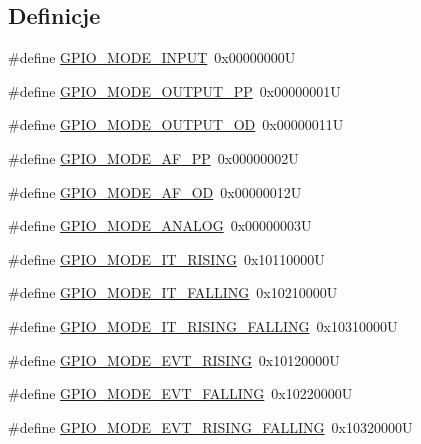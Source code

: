 \subsection*{Definicje}
\begin{DoxyCompactItemize}
\item 
\#define \hyperlink{group___g_p_i_o__mode__define_gaf40bec3146810028a84b628d37d3b391}{G\+P\+I\+O\+\_\+\+M\+O\+D\+E\+\_\+\+I\+N\+P\+UT}~0x00000000U
\item 
\#define \hyperlink{group___g_p_i_o__mode__define_ga1013838a64cec2f8c88f079c449d1982}{G\+P\+I\+O\+\_\+\+M\+O\+D\+E\+\_\+\+O\+U\+T\+P\+U\+T\+\_\+\+PP}~0x00000001U
\item 
\#define \hyperlink{group___g_p_i_o__mode__define_ga2f91757829f6e9505ec386b840941929}{G\+P\+I\+O\+\_\+\+M\+O\+D\+E\+\_\+\+O\+U\+T\+P\+U\+T\+\_\+\+OD}~0x00000011U
\item 
\#define \hyperlink{group___g_p_i_o__mode__define_ga526c72c5264316fc05c775b6cad4aa6a}{G\+P\+I\+O\+\_\+\+M\+O\+D\+E\+\_\+\+A\+F\+\_\+\+PP}~0x00000002U
\item 
\#define \hyperlink{group___g_p_i_o__mode__define_ga282b9fd37c8ef31daba314ffae6bf023}{G\+P\+I\+O\+\_\+\+M\+O\+D\+E\+\_\+\+A\+F\+\_\+\+OD}~0x00000012U
\item 
\#define \hyperlink{group___g_p_i_o__mode__define_ga7a04f9ab65ad572ad20791a35009220c}{G\+P\+I\+O\+\_\+\+M\+O\+D\+E\+\_\+\+A\+N\+A\+L\+OG}~0x00000003U
\item 
\#define \hyperlink{group___g_p_i_o__mode__define_ga088659562e68426d9a72821ea4fd8d50}{G\+P\+I\+O\+\_\+\+M\+O\+D\+E\+\_\+\+I\+T\+\_\+\+R\+I\+S\+I\+NG}~0x10110000U
\item 
\#define \hyperlink{group___g_p_i_o__mode__define_gaa166210a6da3ac7e8d7504702520e522}{G\+P\+I\+O\+\_\+\+M\+O\+D\+E\+\_\+\+I\+T\+\_\+\+F\+A\+L\+L\+I\+NG}~0x10210000U
\item 
\#define \hyperlink{group___g_p_i_o__mode__define_ga0678e61090ed61e91a6496f22ddfb3d1}{G\+P\+I\+O\+\_\+\+M\+O\+D\+E\+\_\+\+I\+T\+\_\+\+R\+I\+S\+I\+N\+G\+\_\+\+F\+A\+L\+L\+I\+NG}~0x10310000U
\item 
\#define \hyperlink{group___g_p_i_o__mode__define_ga97d78b82ea178ff7a4c35aa60b4e9338}{G\+P\+I\+O\+\_\+\+M\+O\+D\+E\+\_\+\+E\+V\+T\+\_\+\+R\+I\+S\+I\+NG}~0x10120000U
\item 
\#define \hyperlink{group___g_p_i_o__mode__define_gadbfa532b3566783ac6c0e07c2e0ffe5e}{G\+P\+I\+O\+\_\+\+M\+O\+D\+E\+\_\+\+E\+V\+T\+\_\+\+F\+A\+L\+L\+I\+NG}~0x10220000U
\item 
\#define \hyperlink{group___g_p_i_o__mode__define_ga1b760771297ed2fc55a6b13071188491}{G\+P\+I\+O\+\_\+\+M\+O\+D\+E\+\_\+\+E\+V\+T\+\_\+\+R\+I\+S\+I\+N\+G\+\_\+\+F\+A\+L\+L\+I\+NG}~0x10320000U
\end{DoxyCompactItemize}


